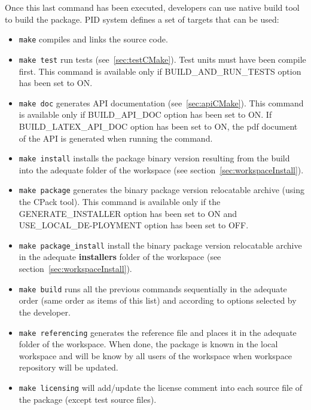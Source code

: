 \documentclass[12pt,a4paper]{article}
\begin{document}
Once this last command has been executed, developers can use native build tool to build the package. PID system defines a set of targets that can be used:
\begin{itemize}
\item \texttt{make} compiles and links the source code.
\item \texttt{make test} run tests (see~\ref{sec:testCMake}). Test units must have been compile first. This command is available only if BUILD\_AND\_RUN\_TESTS option has been set to ON.
\item \texttt{make doc} generates API documentation (see~\ref{sec:apiCMake}). This command is available only if BUILD\_API\_DOC option has been set to ON. If BUILD\_LATEX\_API\_DOC option has been set to ON, the pdf document of the API is generated when running the command.
\item \texttt{make install} installs the package binary version resulting from the build into the adequate folder of the workspace (see section~\ref{sec:workspaceInstall}).
\item \texttt{make package} generates the binary package version relocatable archive (using the CPack tool). This command is available only if the GENERATE\_INSTALLER option has been set to ON and USE\_LOCAL\_DE-PLOYMENT option has been set to OFF.
\item \texttt{make package\_install} install the binary package version relocatable archive in the adequate \textbf{installers} folder of the workspace (see section~\ref{sec:workspaceInstall}).
\item \texttt{make build} runs all the previous commands sequentially in the adequate order (same order as items of this list) and according to options selected by the developer.
\item \texttt{make referencing} generates the reference file and places it in the adequate folder of the workspace. When done, the package is known in the local workspace and will be know by all users of the workspace when workspace repository will be updated.
\item \texttt{make licensing} will add/update the license comment into each source file of the package (except test source files). 
\end{itemize}
\end{document}
